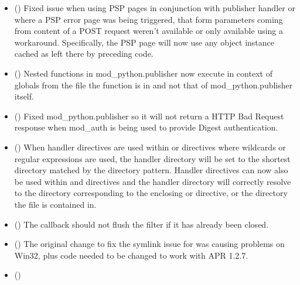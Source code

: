   \begin{itemize}
  \item
      ()
      Fixed issue when using PSP pages in conjunction with publisher handler
      or where a PSP error page was being triggered, that form parameters
      coming from content of a POST request weren't available or only available
      using a workaround. Specifically, the PSP page will now use any
       object instance cached as  left
      there by preceding code.
    \item
      ()
      Nested  functions in mod_python.publisher now execute
      in context of globals from the file the function is in and not that
      of mod_python.publisher itself.
    \item
      ()
      Fixed mod_python.publisher so it will not return a HTTP Bad Request
      response when mod_auth is being used to provide Digest authentication.
    \item
      ()
      When handler directives are used within  or
       directives where wildcards or regular
      expressions are used, the handler directory will be set to the
      shortest directory matched by the directory pattern. Handler
      directives can now also be used within  and
       directives and the handler directory will correctly
      resolve to the directory corresponding to the enclosing
       or  directive, or the directory
      the  file is contained in.
    \item
      ()
      The  callback should not flush the filter if it
      has already been closed.
    \item
      ()
      The original change to fix the symlink issue for 
      was causing problems on Win32, plus code needed to be changed to work
      with APR 1.2.7.
    \item
      ()

\end{itemize}
